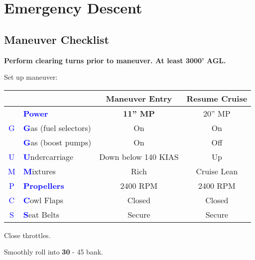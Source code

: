 {\newpage

\section{Emergency Descent}
\subsection{Maneuver Checklist}

\textbf{Perform clearing turns prior to maneuver. At least 3000' AGL.}

Set up maneuver:

\begin{table}[H]
\centering
\begin{tabular}{|c|l|c|c|}
\hline
                    &                                                 & \textbf{Maneuver Entry} & \textbf{Resume Cruise} \\ \hline
                    & \textcolor{blue}{\textbf{Power}}                & \textbf{11'' MP}        & 20'' MP                \\ \hline
\textcolor{blue}{G} & \textcolor{blue}{\textbf{G}}as (fuel selectors) & On                      & On                     \\
                    & \textcolor{blue}{\textbf{G}}as (boost pumps)    & On                      & Off                    \\ \hline
\textcolor{blue}{U} & \textcolor{blue}{\textbf{U}}ndercarriage        & Down below 140 KIAS     & Up                     \\ \hline
\textcolor{blue}{M} & \textcolor{blue}{\textbf{M}}ixtures             & Rich                    & Cruise Lean            \\ \hline
\textcolor{blue}{P} & \textcolor{blue}{\textbf{Propellers}}           & 2400 RPM                & 2400 RPM               \\ \hline
\textcolor{blue}{C} & \textcolor{blue}{\textbf{C}}owl Flaps           & Closed                  & Closed                 \\ \hline
\textcolor{blue}{S} & \textcolor{blue}{\textbf{S}}eat Belts           & Secure                  & Secure                 \\ \hline
\end{tabular}
\end{table}

Close throttles.

Smoothly roll into \textbf{30\degree{}} - 45\degree{} bank.

}
